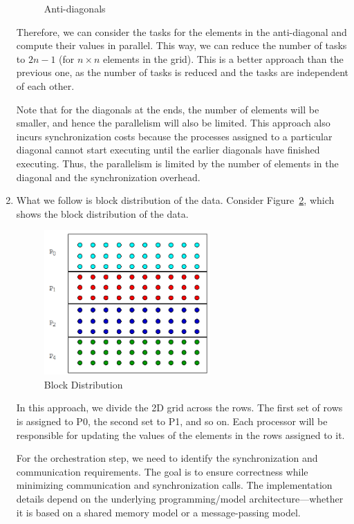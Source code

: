 \documentclass[12pt]{book}
\begin{document}
\begin{enumerate}
\begin{figure}[ht]
    \caption{Anti-diagonals}
    \label{fig:anti-diag_examp}
\end{figure}
    \vspace{5pt}
    Therefore, we can consider the tasks for the elements in the anti-diagonal and compute their values in parallel. This way, we can reduce the number of tasks to $2n - 1$ (for $n \times n$ elements in the grid). This is a better approach than the previous one, as the number of tasks is reduced and the tasks are independent of each other.

    \vspace{5pt}
    Note that for the diagonals at the ends, the number of elements will be smaller, and hence the parallelism will also be limited. This approach also incurs synchronization costs because the processes assigned to a particular diagonal cannot start executing until the earlier diagonals have finished executing. Thus, the parallelism is limited by the number of elements in the diagonal and the synchronization overhead.

    \item What we follow is block distribution of the data. Consider Figure~\ref{fig:block}, which shows the block distribution of the data.
    
    \begin{figure}[H]
        \centering
        \includegraphics[width=0.6\textwidth]{images/block.png}
        \caption{Block Distribution}
        \label{fig:block}
    \end{figure}
    
    In this approach, we divide the 2D grid across the rows. The first set of rows is assigned to P0, the second set to P1, and so on. Each processor will be responsible for updating the values of the elements in the rows assigned to it.

    \vspace{5pt}
    For the orchestration step, we need to identify the synchronization and communication requirements. The goal is to ensure correctness while minimizing communication and synchronization calls. The implementation details depend on the underlying programming/model architecture—whether it is based on a shared memory model or a message-passing model.
\end{enumerate}
\end{document}

